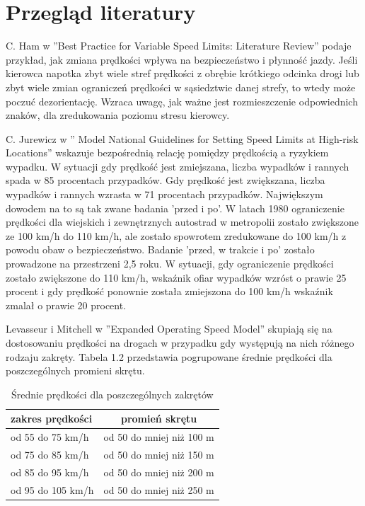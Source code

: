 \section{Przegląd literatury}
\label{sec:przegladLiteratury}	

C. Ham w  ''Best Practice for Variable Speed Limits: Literature Review'' podaje przykład, jak zmiana prędkości wpływa na bezpieczeństwo i płynność jazdy. Jeśli kierowca napotka zbyt wiele stref prędkości z obrębie krótkiego odcinka drogi lub zbyt wiele zmian ograniczeń prędkości w sąsiedztwie danej strefy, to wtedy może poczuć dezorientację. Wzraca uwagę, jak ważne jest rozmieszczenie odpowiednich znaków, dla zredukowania poziomu stresu kierowcy.

C. Jurewicz w '' Model National Guidelines for Setting Speed Limits at High-risk Locations'' wskazuje bezpośrednią relację pomiędzy prędkością a ryzykiem wypadku. W sytuacji gdy prędkość jest zmiejszana,  liczba wypadków i rannych spada w 85 procentach przypadków. Gdy prędkość jest zwiększana, liczba wypadków i rannych wzrasta w 71 procentach przypadków. Największym dowodem na to są tak zwane badania 'przed i po'. W latach 1980 ograniczenie prędkości dla wiejskich i zewnętrznych autostrad w metropolii zostało zwiększone ze 100 km/h do 110 km/h, ale zostało spowrotem zredukowane do 100 km/h z powodu obaw o bezpieczeństwo. Badanie 'przed, w trakcie i po' zostało prowadzone na przestrzeni 2,5 roku. W sytuacji, gdy ograniczenie prędkości zostało zwiększone do 110 km/h, wskaźnik ofiar wypadków wzróst o prawie 25 procent i gdy prędkość ponownie została zmiejszona do 100 km/h wskaźnik zmalał o prawie 20 procent.

	Levasseur i Mitchell w ''Expanded Operating Speed Model'' skupiają się na dostosowaniu prędkości na drogach w przypadku gdy występują na nich różnego rodzaju zakręty. Tabela 1.2 przedstawia pogrupowane średnie prędkości dla poszczególnych promieni skrętu.
	
\begin{table}[ht]
\centering
\caption{Średnie prędkości dla poszczególnych zakrętów}
\label{my-label}
\begin{tabular}{| l | c |}
\hline
\textbf{zakres prędkości}                    & \textbf{promień skrętu} \\ \hline
od 55 do 75 km/h          & od 50 do mniej niż 100 m \\ \hline
od 75 do 85 km/h          & od 50 do mniej niż 150 m  \\ \hline
od 85 do 95 km/h  &  od 50 do mniej niż 200 m\\ \hline
od 95 do 105 km/h  &  od 50 do mniej niż 250 m\\ \hline

\end{tabular}
\end{table}


